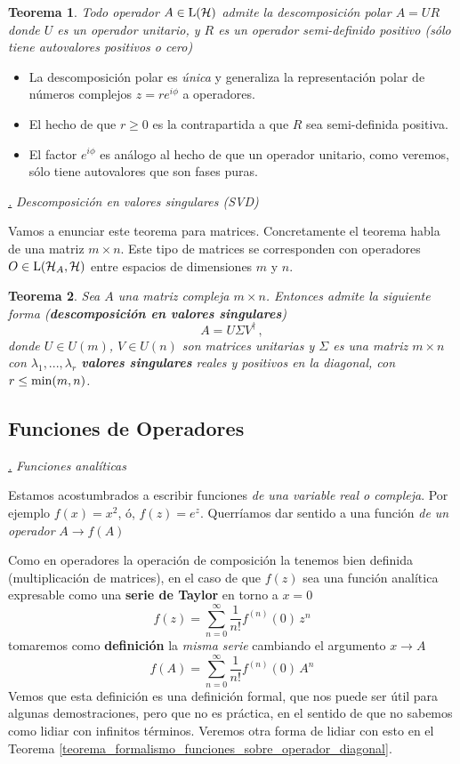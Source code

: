 \documentclass[a4paper,11pt]{book} %
\newtheorem{teorema_contador}{Teorema}
\newcommand{\Teorema}[1]{
		\begin{mybox_gray2}{}
			\begin{teorema_contador}
				 #1 
			\end{teorema_contador} 
		\end{mybox_gray2}
	}
\numberwithin{equation}{chapter}
\def\subsubiContadorIt{\par\addtocounter{subsubsection}{1}\underline{\it\thesubsubsection.}\hskip0.5cm \setcounter{subsubsubsectionIt}{0}}
\newcommand{\SubsubiIt}[1]{
		\subsubiContadorIt \textit{#1}
	}
\newcounter{subsubsubsectionIt}[subsubsection]
\begin{document}
	\Teorema{Todo operador $A\in{\rm L}(\mathcal{H})$ admite la descomposición polar $A = UR$ donde $U$ es un operador unitario, y $R$ es un operador semi-definido positivo (sólo tiene autovalores positivos o cero)
	}

\begin{itemize}
	\item La descomposición polar es \textit{única} y generaliza la representación polar de números complejos $z = r e^{i\phi}$ a operadores.
	\item El hecho de que $r\geq 0$ es la contrapartida a que $R$ sea semi-definida positiva. 
	\item El factor $e^{i\phi}$ es análogo al hecho de que un operador unitario, como veremos, sólo tiene autovalores que son fases puras.
\end{itemize}


			\SubsubiIt{Descomposición en valores singulares (SVD)}

Vamos a enunciar este teorema para matrices. Concretamente el teorema habla de una matriz $m\times n$. Este tipo de matrices se corresponden con operadores $O \in{\rm L}(\mathcal{H}_A,\mathcal{H})$ entre espacios de dimensiones $m$ y $n$.

	\Teorema{
	Sea $A$ una matriz compleja $m\times n$. Entonces  admite la siguiente forma (\textbf{descomposición en valores singulares})
	$$
	A = U\Sigma V^{\dagger} \, ,
	$$
	donde $U\in U(m)$, $V\in U(n)$ son matrices unitarias y $\Sigma$ es una matriz  $m\times n$ con $\lambda_1, ...,\lambda_r$ \textbf{valores singulares} reales y positivos en la diagonal, con $r\leq {\rm min}(m,n)$. 
	}



		\subsection{Funciones de Operadores}
		
			\SubsubiIt{Funciones analíticas}

Estamos acostumbrados a escribir funciones \textit{de una variable real o compleja}. Por ejemplo $f(x)= x^2$, ó, $ f(z) = e^z$. Querríamos dar sentido a una función \textit{de un operador} 
$
A \to f(A)
$


Como en operadores la operación de composición la tenemos bien definida (multiplicación de matrices), en el caso de que $f(z)$ sea una función analítica expresable como una \textbf{serie de Taylor} en torno a $x=0$ 
	\begin{equation}
	f(z) = \sum_{n=0}^\infty \frac{1}{n!} f^{(n)}(0)\,  z^n
	\end{equation}
tomaremos como \textbf{definición} la \textit{misma serie} cambiando el argumento $x\to A$
	\begin{equation}
	f(A) = \sum_{n=0}^\infty \frac{1}{n!} f^{(n)}(0)\,  A^n
	\end{equation}
Vemos que esta definición es una definición formal, que nos puede ser útil para algunas demostraciones, pero que no es práctica, en el sentido de que no sabemos como lidiar con infinitos términos. Veremos otra forma de lidiar con esto en el Teorema \ref{teorema_formalismo_funciones_sobre_operador_diagonal}.
\end{document}

